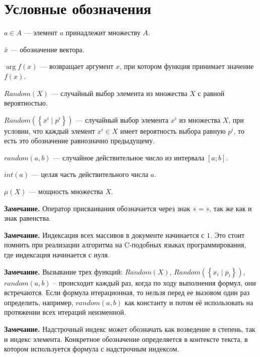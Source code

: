 
\chapter*{Условные обозначения}
$a \in A$ --- элемент $ a $ принадлежит множеству $ A $.

$ \bar{x} $ --- обозначение вектора.

$ \arg{f(x)} $ --- возвращает аргумент $x$, при котором функция принимает значение $ f(x) $.

$ Random(X) $ --- случайный выбор элемента из множества $ X $ с равной вероятностью.

$ Random\left ( \left \{x^i \mid p^i \right \} \right ) $ --- случайный выбор элемента $ x^i $ из множества $ X $, при условии, что каждый элемент $ x^i\in X $ имеет вероятность выбора равную $ p^i $, то есть это обозначение равнозначно предыдущему.

$ random(a,b) $ --- случайное действительное число из интервала $ [a; b] $.

$ int(a) $ --- целая часть действительного числа $ a $.

$ \mu(X) $ --- мощность множества $ X $.

\textbf{Замечание.} Оператор присваивания обозначается через знак «$ = $», так же как и знак равенства.

\textbf{Замечание.} Индексация всех массивов в документе начинается с $ 1 $. Это стоит помнить при реализации алгоритма на C-подобных языках программирования, где индексация начинается с нуля.

\textbf{Замечание.} Вызывание трех функций: $ Random(X) $, $ Random\left ( \left \{x_i \mid p_i \right \} \right ) $, $ random(a,b) $ – происходит каждый раз, когда по ходу выполнения формул, они встречаются. Если формула итерационная, то нельзя перед ее вызовом один раз определить, например, $ random(a,b) $ как константу и потом её использовать на протяжении всех итераций неизменной.

\textbf{Замечание.} Надстрочный индекс может обозначать как возведение в степень, так и индекс элемента. Конкретное обозначение определяется в контексте текста, в котором используется формула с надстрочным индексом. 

